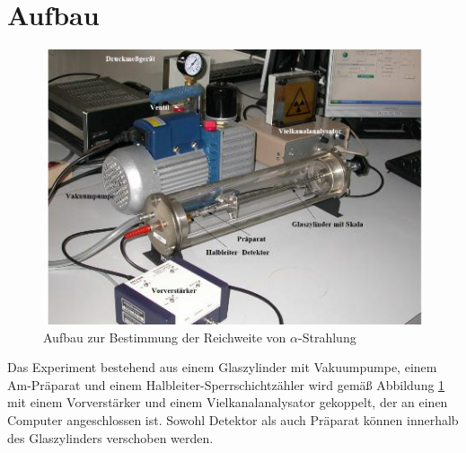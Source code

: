 \section{Aufbau}
\label{sec:Aufbau}

\begin{figure}
\centering
\includegraphics[scale=0.6]{content/images/aufbau.jpg}
\caption{Aufbau zur Bestimmung der Reichweite von $\alpha$-Strahlung\cite{V701}}
\label{fig:aufbau}
\end{figure}

Das Experiment bestehend aus einem Glaszylinder mit Vakuumpumpe, einem Am-Präparat und einem Halbleiter-Sperrschichtzähler wird gemäß Abbildung \ref{fig:aufbau} mit einem Vorverstärker und einem Vielkanalanalysator gekoppelt, der an einen Computer angeschlossen ist.
Sowohl Detektor als auch Präparat können innerhalb des Glaszylinders verschoben werden.
